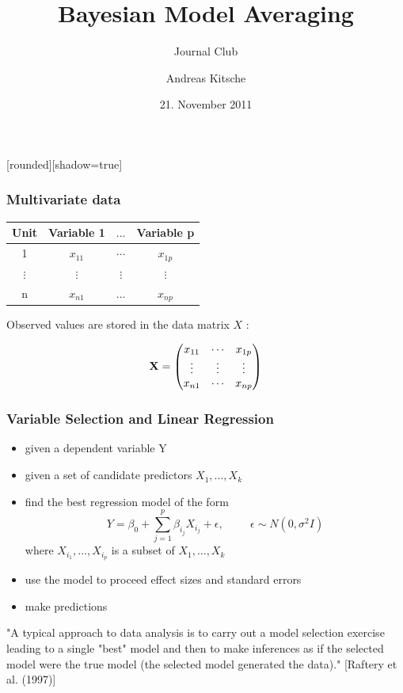\documentclass[hyperref={pdfpagelabels=true}]{beamer}
\title{Bayesian Model Averaging}
\subtitle{Journal Club}
\institute[Institut für Biostatistik]{Institute of Biostatistics\\ \url{andreaskitsche@gmail.com}}
\author{Andreas Kitsche}
\date{21. November 2011}
\begin{document}

[rounded][shadow=true]
\addtocounter{framenumber}{-1}

\begin{frame}
\titlepage
\end{frame}






\begin{frame}
\frametitle{Multivariate data}
\begin{table}
	\centering
		\begin{tabular}{cccc} \hline
		Unit & Variable 1 & $\ldots$ & Variable p\\ \hline
		1 & $x_{11}$ & $\cdots$ & $x_{1p}$\\
		$\vdots$ & $\vdots$ & $\vdots$ & $\vdots$ \\
		n&$x_{n1}$ & $\ldots$ & $x_{np}$ \\ \hline
		\end{tabular}
\end{table}
Observed values are stored in the data matrix  \boldmath$X$ \unboldmath:

\begin{align*}
\bf X = \begin{pmatrix}
x_{11} &  \cdots & x_{1p}\\
\vdots & \vdots &\vdots  \\ 
x_{n1} & \cdots & x_{np}
\end{pmatrix}
\end{align*}

\nocite{Genell.2010}
\nocite{Raftery.1997}
\nocite{Hoeting.2000}
\nocite{Clyde.1999}
\nocite{PENROSE.1985}

\end{frame}

\begin{frame}
\frametitle{Variable Selection and Linear Regression}
\begin{itemize}
\item given a dependent variable Y
\item given a set of candidate predictors $X_{1},\ldots,X_{k}$
\item find the best regression model of the form
\[
Y = \beta_{0} + \sum_{j=1}^{p}\beta_{i_{j}}X_{i_{j}} + \epsilon, \hspace{1cm} \epsilon \sim N(0, \sigma^{2}I)
\]
where $X_{i_{1}},\ldots,X_{i_{p}}$ is a subset of $X_{1},\ldots,X_{k}$\\
\item use the model to proceed effect sizes and standard errors
\item make predictions
\end{itemize}
\vspace{0.5cm}
"A typical approach to data analysis is to carry out a
model selection exercise leading to a single "best" model
and then to make inferences as if the selected model were
the true model (the selected model generated the data)." [Raftery et al. (1997)]
\end{frame}
\end{document}
